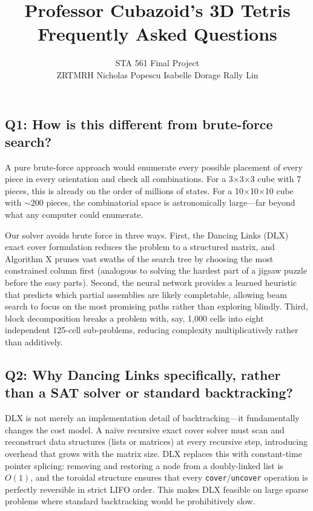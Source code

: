 \documentclass[11pt]{article}
\title{\textbf{Professor Cubazoid's 3D Tetris}\\[0.3em]
\large Frequently Asked Questions}
\author{STA 561 Final Project\\[0.3em]
ZRTMRH \quad Nicholas Popescu \quad Isabelle Dorage \quad Rally Lin}
\date{}
\begin{document}
\maketitle
\thispagestyle{empty}

\subsection*{Q1: How is this different from brute-force search?}

A pure brute-force approach would enumerate every possible placement of every piece in every orientation and check all combinations. For a 3$\times$3$\times$3 cube with 7 pieces, this is already on the order of millions of states. For a 10$\times$10$\times$10 cube with $\sim$200 pieces, the combinatorial space is astronomically large---far beyond what any computer could enumerate.

Our solver avoids brute force in three ways. First, the Dancing Links (DLX) exact cover formulation reduces the problem to a structured matrix, and Algorithm X prunes vast swaths of the search tree by choosing the most constrained column first (analogous to solving the hardest part of a jigsaw puzzle before the easy parts). Second, the neural network provides a learned heuristic that predicts which partial assemblies are likely completable, allowing beam search to focus on the most promising paths rather than exploring blindly. Third, block decomposition breaks a problem with, say, 1,000 cells into eight independent 125-cell sub-problems, reducing complexity multiplicatively rather than additively.

\subsection*{Q2: Why Dancing Links specifically, rather than a SAT solver or standard backtracking?}

DLX is not merely an implementation detail of backtracking---it fundamentally changes the cost model. A na\"ive recursive exact cover solver must scan and reconstruct data structures (lists or matrices) at every recursive step, introducing overhead that grows with the matrix size. DLX replaces this with constant-time pointer splicing: removing and restoring a node from a doubly-linked list is $O(1)$, and the toroidal structure ensures that every \texttt{cover}/\texttt{uncover} operation is perfectly reversible in strict LIFO order. This makes DLX feasible on large sparse problems where standard backtracking would be prohibitively slow.
\end{document}
